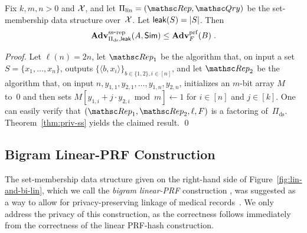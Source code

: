 \begin{theorem}%
\label{thm:lin-privacy} Fix $k,m,n>0$ and ${\cal X}$, and let
$\setprim_{\mathrm{lin}}= (\Rep, \Qry)$ be the set-membership data
structure over~${\cal X}$. Let ${\sf leak}(S)=|S|$.  Then 
\[
\mathrm{\mathbf{Adv}}^{\mathrm{ss\mbox{-}rep}}_{\Pi_{\mathrm{ds}},{\sf leak}}(A,{\sf Sim}) \leq  \mathbf{Adv}^{\mathrm{prf}}_{F}(B)\;.
\]
\end{theorem}
\begin{proof}
Let $\ell(n) = 2n$, let $\Rep_1$ be the algorithm that, on input a
set $S=\{x_1,\ldots,x_n\}$, outputs $\{\langle b,x_i \rangle\}_{b\in
\{1,2\}, i \in [n]}$, and let $\Rep_2$ be the algorithm that, on
input $n,y_{1,1}, y_{2,1}, \ldots, y_{1,n}, y_{2,n}$,  initializes
an $m$-bit array $M$ to~0 and then sets $M[y_{1,i}+j \cdot y_{2,i}
\bmod m] \gets 1$ for $i \in [n]$ and $j \in [k]$. One can easily
verify that $(\Rep_1, \Rep_2, \ell, F)$ is a factoring
of~$\Pi_{\mathrm{ds}}$. Theorem~\ref{thm:priv-ss} yields the claimed
result. \hfill\qed
\end{proof}

\subsection{Bigram Linear-PRF Construction}

The set-membership data structure given on the right-hand side of
Figure~\ref{fig:lin-and-bi-lin}, which we call the \emph{bigram
linear-PRF} construction , was
suggested as a way to allow for privacy-preserving linkage of
medical records~\cite{schnell2011novel}.  We only address the privacy of this construction, as the
correctness follows immediately from the correctness of the linear
PRF-hash construction. 

